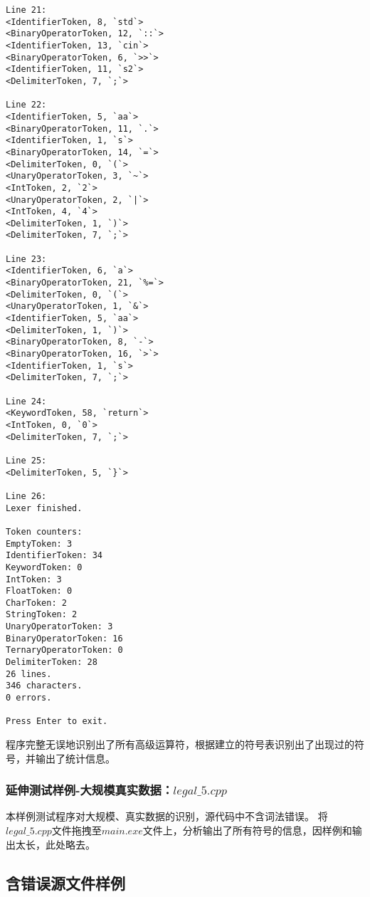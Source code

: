 \documentclass[UTF8]{ctexart}
\begin{document}
\begin{lstlisting}
Line 21:
<IdentifierToken, 8, `std`>
<BinaryOperatorToken, 12, `::`>
<IdentifierToken, 13, `cin`>
<BinaryOperatorToken, 6, `>>`>
<IdentifierToken, 11, `s2`>
<DelimiterToken, 7, `;`>

Line 22:
<IdentifierToken, 5, `aa`>
<BinaryOperatorToken, 11, `.`>
<IdentifierToken, 1, `s`>
<BinaryOperatorToken, 14, `=`>
<DelimiterToken, 0, `(`>
<UnaryOperatorToken, 3, `~`>
<IntToken, 2, `2`>
<UnaryOperatorToken, 2, `|`>
<IntToken, 4, `4`>
<DelimiterToken, 1, `)`>
<DelimiterToken, 7, `;`>

Line 23:
<IdentifierToken, 6, `a`>
<BinaryOperatorToken, 21, `%=`>
<DelimiterToken, 0, `(`>
<UnaryOperatorToken, 1, `&`>
<IdentifierToken, 5, `aa`>
<DelimiterToken, 1, `)`>
<BinaryOperatorToken, 8, `-`>
<BinaryOperatorToken, 16, `>`>
<IdentifierToken, 1, `s`>
<DelimiterToken, 7, `;`>

Line 24:
<KeywordToken, 58, `return`>
<IntToken, 0, `0`>
<DelimiterToken, 7, `;`>

Line 25:
<DelimiterToken, 5, `}`>

Line 26:
Lexer finished.

Token counters:
EmptyToken: 3
IdentifierToken: 34
KeywordToken: 0
IntToken: 3
FloatToken: 0
CharToken: 2
StringToken: 2
UnaryOperatorToken: 3
BinaryOperatorToken: 16
TernaryOperatorToken: 0
DelimiterToken: 28
26 lines.
346 characters.
0 errors.

Press Enter to exit.
\end{lstlisting}
程序完整无误地识别出了所有高级运算符，根据建立的符号表识别出了出现过的符号，并输出了统计信息。
\subsubsection{延伸测试样例-大规模真实数据：$legal\_5.cpp$}
本样例测试程序对大规模、真实数据的识别，源代码中不含词法错误。
将$legal\_5.cpp$文件拖拽至$main.exe$文件上，分析输出了所有符号的信息，因样例和输出太长，此处略去。
\subsection{含错误源文件样例}
\end{document}
